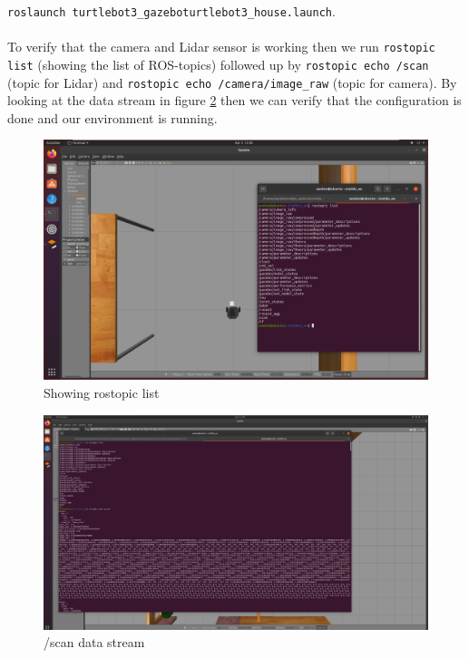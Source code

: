 \documentclass[12pt,a4paper]{article}
\begin{document}
	\noindent\texttt{roslaunch turtlebot3\_gazebo}\texttt{turtlebot3\_house.launch}.
	\\\\
	To verify that the camera and Lidar sensor is working then we run \texttt{rostopic list} (showing the list of ROS-topics) followed up by \texttt{rostopic echo /scan} (topic for Lidar) and \texttt{rostopic echo /camera/image\_raw} (topic for camera). By looking at the data stream in figure \ref{fig:fig5} then we can verify that the configuration is done and our environment is running.
	\begin{figure}[!h]
		\centering
		\includegraphics[width=\linewidth]{fig4.png}
		\caption{Showing rostopic list}
		\label{fig:fig4}
	\end{figure}
	\begin{figure}[!h]
		\centering
		\includegraphics[width=\linewidth]{fig5.png}
		\caption{/scan data stream}
		\label{fig:fig5}
	\end{figure}
	\clearpage
\end{document}
